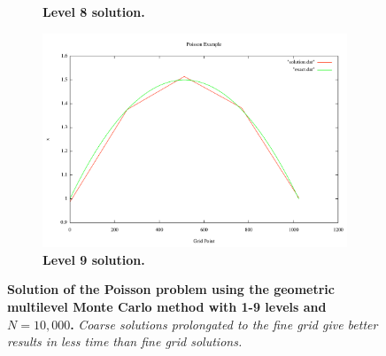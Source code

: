 \documentclass[note]{TechNote}
\begin{document}
\begin{figure}[h!]
\begin{subfigure}[b]{0.32\textwidth}
    \caption{\textbf{Level 8 solution.}}
  \end{subfigure}
  \begin{subfigure}[b]{0.32\textwidth}
    \includegraphics[width=\textwidth]{cg_9_level.pdf}
    \caption{\textbf{Level 9 solution.}}
  \end{subfigure}
  \caption{\textbf{Solution of the Poisson problem using the geometric
      multilevel Monte Carlo method with 1-9 levels and $N = 10,000$.}
    \textit{Coarse solutions prolongated to the fine grid give better
      results in less time than fine grid solutions.}}
  \label{fig:heterogenous_cg_solutions}
\end{figure}

\clearpage




\closing
\caution
\end{document}
